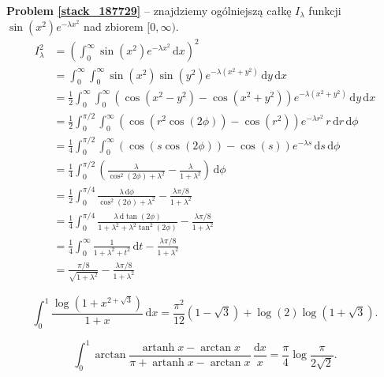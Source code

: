 \textbf{Problem \ref{stack_187729}} -- znajdziemy ogólniejszą całkę $I_\lambda$ funkcji $\sin(x^2) e^{-\lambda x^2}$ nad zbiorem $[0, \infty)$.
\begin{align}
    I_\lambda^2 & = \left(\int_0^\infty \sin(x^2) e^{-\lambda x^2} \,\mathrm{d}x \right)^2 \\
    & = \int_0^\infty \int_0^\infty \sin(x^2)\sin(y^2) e^{- \lambda(x^2+y^2)}\,\mathrm{d}y\,\mathrm{d}x \\
    & = \frac12 \int_0^\infty \int_0^\infty \left(\cos(x^2-y^2)-\cos(x^2+y^2)\right) e^{- \lambda(x^2+y^2)}\,\mathrm{d}y\,\mathrm{d}x \\
    & = \frac12 \int_0^{\pi/2} \int_0^\infty \left(\cos(r^2\cos(2\phi))-\cos(r^2)\right)e^{- \lambda r^2} \,r\,\mathrm{d}r\,\mathrm{d}\phi \\
    & = \frac14 \int_0^{\pi/2} \int_0^\infty \left(\cos(s\cos(2\phi))-\cos(s)\right) e^{- \lambda s} \,\mathrm{d}s\,\mathrm{d}\phi \\
    & = \frac14 \int_0^{\pi/2} \left( \frac{ \lambda}{\cos^2(2\phi)+ \lambda^2} - \frac{ \lambda}{1+ \lambda^2}\right)\,\mathrm{d}\phi \\
    & = \frac12 \int_0^{\pi/4} \frac{ \lambda\,\mathrm{d}\phi}{\cos^2(2\phi)+ \lambda^2} - \frac{ \lambda\pi/8}{1+ \lambda^2} \\
    & = \frac14 \int_0^{\pi/4} \frac{ \lambda\,\mathrm{d} \tan(2\phi)} {1+ \lambda^2+ \lambda^2 \tan^2(2\phi)} - \frac{ \lambda\pi/8}{1+ \lambda^2} \\
    & = \frac14 \int_0^\infty \frac1{1+ \lambda^2+t^2}\,\mathrm{d}t - \frac{ \lambda\pi/8}{1+ \lambda^2} \\
    & = \frac{\pi/8}{\sqrt{1+ \lambda^2}} - \frac{ \lambda\pi/8}{1+ \lambda^2}
\end{align}


\begin{problem}[pytanie 426325]
    \label{stack_426325}%
    \begin{equation}
        \int_0^1 \frac{\log \left(1 + x^{2 + \sqrt 3}\right)}{1 + x} \,\mathrm{d} x = \frac{\pi^2}{12} (1 - \sqrt 3) + \log (2) \log(1 + \sqrt 3).
    \end{equation}
\end{problem}


\begin{problem}[pytanie 464769]
    \label{stack_464769}%
    \begin{equation}
        \int_0^1 \arctan \frac { \operatorname{artanh} x - \arctan x} {\pi + \operatorname{artanh} x - \arctan x}  \, \frac{\mathrm{d}x}{x} = \frac \pi 4 \log \frac{\pi}{2 \sqrt{2}}.
    \end{equation}
\end{problem}

